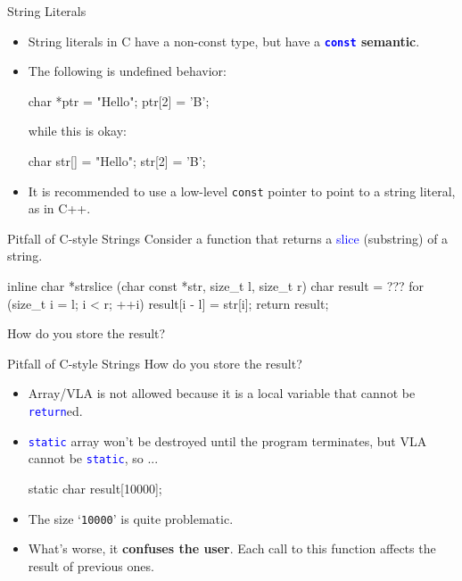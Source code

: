 \documentclass[handout]{beamer}
\newcommand{\blue}[1]{\textcolor{blue}{#1}}
\newcommand{\ttt}[1]{\texttt{#1}}
\newcommand{\bluett}[1]{\blue{\ttt{#1}}}
\theoremstyle{definition}
\begin{document}
\begin{frame}[fragile]{String Literals}
    \begin{itemize}
        \item String literals in C have a non-const type, but have a \textbf{\bluett{const} semantic}.
        \item The following is undefined behavior:
        \begin{cpp}
char *ptr = "Hello";
ptr[2] = 'B';
        \end{cpp}
        while this is okay:
        \begin{cpp}
char str[] = "Hello";
str[2] = 'B';
        \end{cpp}
        \pause
        \item It is recommended to use a low-level \ttt{const} pointer to point to a string literal, as in C++.
    \end{itemize}
\end{frame}

\begin{frame}[fragile]{Pitfall of C-style Strings}
    Consider a function that returns a \blue{slice} (substring) of a string.
    \begin{cpp}
inline char *strslice
    (char const *str, size_t l, size_t r) {
  char result = ???
  for (size_t i = l; i < r; ++i)
    result[i - l] = str[i];
  return result;
}
    \end{cpp}
    How do you store the result?
\end{frame}

\begin{frame}[fragile]{Pitfall of C-style Strings}
    How do you store the result?
    \begin{itemize}
        \pause
        \item Array/VLA is not allowed because it is a local variable that cannot be \bluett{return}ed.
        \pause
        \item \bluett{static} array won't be destroyed until the program terminates, but VLA cannot be \bluett{static}, so ...
        \begin{cpp}
static char result[10000];
        \end{cpp}
        \item The size `\ttt{10000}' is quite problematic.
        \pause
        \item What's worse, it \textbf{confuses the user}. Each call to this function affects the result of previous ones.
    \end{itemize}
\end{frame}
\end{document}
